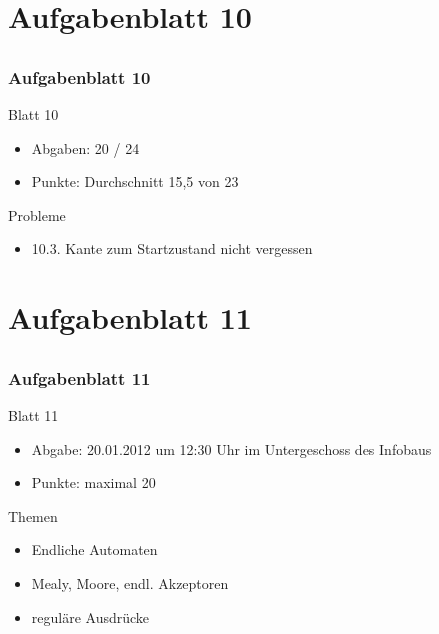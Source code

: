 
\section[Rückblick ÜB 10]{Aufgabenblatt 10}
\subsection*{}
\begin{frame}
	\frametitle{Aufgabenblatt 10}
	\begin{block}{Blatt 10}
		\begin{itemize}
			\item Abgaben: 20 / 24
			\item Punkte: Durchschnitt 15,5 von 23
		\end{itemize}
   \end{block}
	\begin{block}{Probleme}
 		\begin{itemize}
			\item 10.3. Kante zum Startzustand nicht vergessen
 	  \end{itemize}
	\end{block}
\end{frame}

\section[Blatt 11]{Aufgabenblatt 11}
\subsection*{}
\begin{frame}
	\frametitle{Aufgabenblatt 11}
	\begin{block}{Blatt 11}
		\begin{itemize}
			\item Abgabe: 20.01.2012 um 12:30 Uhr im Untergeschoss des Infobaus
			\item Punkte: maximal 20
		\end{itemize}
  	\end{block}
	\begin{block}{Themen}
		\begin{itemize}
	  		\item Endliche Automaten
	  		\item Mealy, Moore, endl. Akzeptoren
			\item reguläre Ausdrücke
	 	\end{itemize}
	\end{block}
\end{frame}
